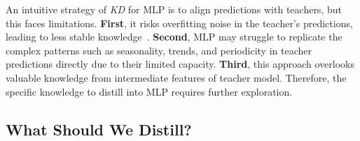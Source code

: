 An intuitive strategy of \textit{KD} for MLP is to align predictions with teachers, but this faces limitations. \textbf{First}, it risks overfitting noise in the teacher’s predictions, leading to less stable knowledge~\cite{chen2017learning, takamoto2020efficient, gajbhiye2021knowledge}. \textbf{Second}, MLP may struggle to replicate the complex patterns such as seasonality, trends, and periodicity in teacher predictions directly due to their limited capacity. \textbf{Third}, this approach overlooks valuable knowledge from intermediate features of teacher model. Therefore, the specific knowledge to distill into MLP requires further exploration.

\subsection{What Should We Distill?}
\label{sec:what2distill}



